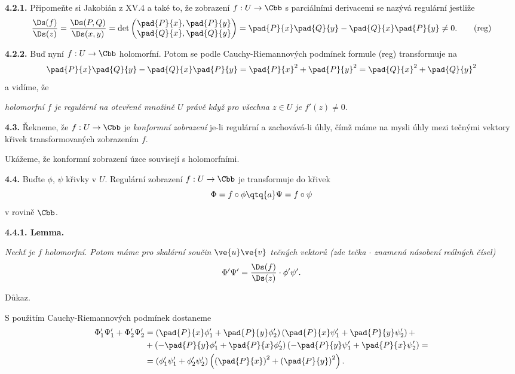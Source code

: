 \documentclass[12pt]{article}
\begin{document}
\medskip

{\bf 4.2.1.}  Připomeňte si Jakobián z XV.4 a také to, že zobrazení $f:U\to \Cbb$ s parciálními derivacemi se nazývá regulární jestliže
\begin{equation}
\frac{\Ds(f)}{\Ds(z)}=\frac{\Ds(P,Q)}{\Ds(x,y)}=\det\left(\begin{matrix}\pad{P}{x},\pad{P}{y}
\\ \pad{Q}{x},\pad{Q}{y}
\end{matrix}\right)=\pad{P}{x}\pad{Q}{y}-\pad{Q}{x}\pad{P}{y}\neq 0.
\tag{reg}
\end{equation}

\medskip



{\bf 4.2.2.} Buď nyní $f:U\to\Cbb$ holomorfní. Potom se podle Cauchy-Riemannových podmínek formule (reg) transformuje na
$$
\pad{P}{x}\pad{Q}{y}-\pad{Q}{x}\pad{P}{y}=\pad{P}{x}^2+\pad{P}{y}^2=
\pad{Q}{x}^2+\pad{Q}{y}^2
$$
a vidíme, že

\medskip

 {\em holomorfní $f$ je regulární  na otevřené množině   $U$ právě když pro
všechna $z\in U$ je $f'(z)\neq 0$.}

\bigskip

{\bf 4.3.} Řekneme, že $f:U\to\Cbb$ je
 {\em konformní zobrazení} je-li regulární a zachovává-li úhly, čímž máme na mysli úhly mezi tečnými vektory křivek transformovaných zobrazením  $f$.

Ukážeme, že konformní zobrazení úzce souvisejí s holomorfními. 

\bigskip


{\bf 4.4.} Buďte $\phi$, $\psi$ křivky v $U$. Regulární zobrazení
$f:U\to\Cbb$ je transformuje do křivek
$$
\Phi=f\circ\phi\qtq{a}\Psi=f\circ\psi
$$
v rovině $\Cbb$.

\medskip


{\bf 4.4.1. Lemma.} {\em Nechť je  $f$ holomorfní. Potom máme pro skalární součin
 $\ve{u}\ve{v}$ tečných vektorů (zde tečka $\cdot$ znamená násobení reálných čísel)
$$
\Phi'\Psi'=\frac{\Ds(f)}{\Ds(z)}\cdot\phi'\psi'.
$$

Důkaz.} S použitím Cauchy-Riemannových podmínek dostaneme
$$
\begin{aligned}
\Phi'_1\Psi'_1+\Phi'_2\Psi'_2&=
\left(\pad{P}{x}\phi'_1+\pad{P}{y}\phi'_2\right)\left(\pad{P}{x}\psi'_1+\pad{P}{y}\psi'_2\right)+\\
&+\left(-\pad{P}{y}\phi'_1+\pad{P}{x}\phi'_2\right)\left(-\pad{P}{y}\psi'_1+\pad{P}{x}\psi'_2\right)=\\
&=\left(\phi'_1\psi'_1+\phi'_2\psi'_2\right)\left(\left(\pad{P}{x}\right)^2+\left(\pad{P}{y}\right)^2\right).
\end{aligned}
$$\sq
\end{document}
